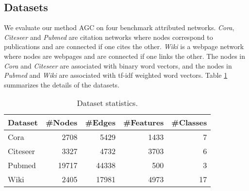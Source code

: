 \documentclass{article}
\begin{document}
\subsection{Datasets}
We evaluate our method AGC on four benchmark attributed networks. \emph{Cora}, \emph{Citeseer} and \emph{Pubmed} \cite{kipf2016variational} are citation networks where nodes correspond to publications and are connected if one cites the other. \emph{Wiki} \cite{yang2015network} is a webpage network where nodes are webpages and are connected if one links the other.
The nodes in \emph{Cora} and \emph{Citeseer} are associated with binary word vectors, and the nodes in \emph{Pubmed} and \emph{Wiki} are associated with tf-idf weighted word vectors. Table \ref{tab:dataset} summarizes the details of the datasets.



\begin{table}[t]
\centering
\footnotesize

\begin{tabular}{lrrrr}
    \toprule
    Dataset    & \#Nodes & \#Edges & \#Features  & \#Classes  \\
    \midrule
    Cora       & 2708   & 5429   & 1433    & 7   \\
    Citeseer   & 3327   & 4732   & 3703    & 6  \\
    Pubmed     & 19717  & 44338  & 500     & 3     \\
    Wiki       & 2405   & 17981  & 4973    & 17  \\
    \bottomrule
\end{tabular}
\caption{Dataset statistics.}
\label{tab:dataset}
\end{table}
\end{document}
